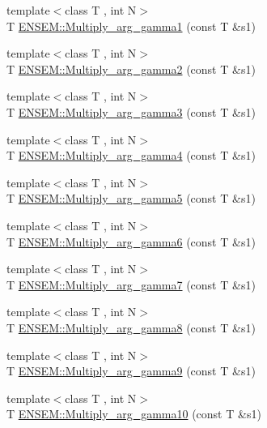 \begin{DoxyCompactItemize}
\item 
{\footnotesize template$<$class T , int N$>$ }\\T \mbox{\hyperlink{namespaceENSEM_a60ccb9e2fa020c162e6bb275d0f3571b}{E\+N\+S\+E\+M\+::\+Multiply\+\_\+arg\+\_\+gamma1}} (const T \&s1)
\item 
{\footnotesize template$<$class T , int N$>$ }\\T \mbox{\hyperlink{namespaceENSEM_a04d25124568b0f6dfc2f0cfe608d8143}{E\+N\+S\+E\+M\+::\+Multiply\+\_\+arg\+\_\+gamma2}} (const T \&s1)
\item 
{\footnotesize template$<$class T , int N$>$ }\\T \mbox{\hyperlink{namespaceENSEM_ac8f8de88f467fc3d60ac735a9fc90e08}{E\+N\+S\+E\+M\+::\+Multiply\+\_\+arg\+\_\+gamma3}} (const T \&s1)
\item 
{\footnotesize template$<$class T , int N$>$ }\\T \mbox{\hyperlink{namespaceENSEM_a85441f4376b87e5b81716bcda5cf3e6a}{E\+N\+S\+E\+M\+::\+Multiply\+\_\+arg\+\_\+gamma4}} (const T \&s1)
\item 
{\footnotesize template$<$class T , int N$>$ }\\T \mbox{\hyperlink{namespaceENSEM_a8e465294989989eb52731a497103b658}{E\+N\+S\+E\+M\+::\+Multiply\+\_\+arg\+\_\+gamma5}} (const T \&s1)
\item 
{\footnotesize template$<$class T , int N$>$ }\\T \mbox{\hyperlink{namespaceENSEM_a4ddbb1d4cde2c8657237efcf3b668f48}{E\+N\+S\+E\+M\+::\+Multiply\+\_\+arg\+\_\+gamma6}} (const T \&s1)
\item 
{\footnotesize template$<$class T , int N$>$ }\\T \mbox{\hyperlink{namespaceENSEM_af6533488ba5049e3bff7f310721cbb7c}{E\+N\+S\+E\+M\+::\+Multiply\+\_\+arg\+\_\+gamma7}} (const T \&s1)
\item 
{\footnotesize template$<$class T , int N$>$ }\\T \mbox{\hyperlink{namespaceENSEM_a0e88a49ab7d0591df524cdca32ea608b}{E\+N\+S\+E\+M\+::\+Multiply\+\_\+arg\+\_\+gamma8}} (const T \&s1)
\item 
{\footnotesize template$<$class T , int N$>$ }\\T \mbox{\hyperlink{namespaceENSEM_a35776b4c580934c4456e696629bc8395}{E\+N\+S\+E\+M\+::\+Multiply\+\_\+arg\+\_\+gamma9}} (const T \&s1)
\item 
{\footnotesize template$<$class T , int N$>$ }\\T \mbox{\hyperlink{namespaceENSEM_adca6a0195009141b0fff947a5beae7a5}{E\+N\+S\+E\+M\+::\+Multiply\+\_\+arg\+\_\+gamma10}} (const T \&s1)

\end{DoxyCompactItemize}
